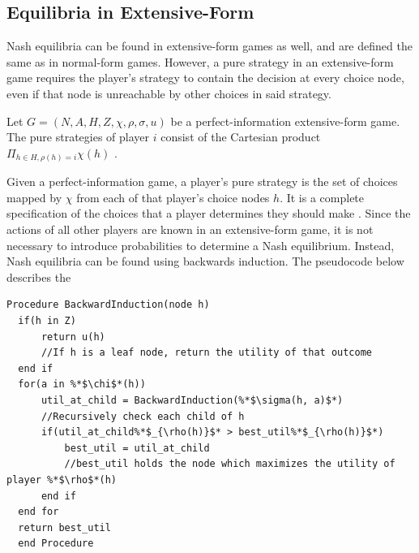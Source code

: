 \subsection{Equilibria in Extensive-Form}
Nash equilibria can be found in extensive-form games as well, and are defined the same as in normal-form games. However, a pure strategy in an extensive-form game requires the player's strategy to contain the decision at every choice node, even if that node is unreachable by other choices in said strategy.\\
\begin{define}
  Let $G = (N, A, H, Z, \chi, \rho, \sigma, u)$ be a perfect-information extensive-form game. The pure strategies of player $i$ consist of the Cartesian product $\Pi_{h\in H, \rho(h)=i}\chi(h)$ \cite{shoh09}.
\end{define}
Given a perfect-information game, a player's pure strategy is the set of choices mapped by $\chi$ from each of that player's choice nodes $h$. It is a complete specification of the choices that a player determines they should make \cite{shoh09}. Since the actions of all other players are known in an extensive-form game, it is not necessary to introduce probabilities to determine a Nash equilibrium. Instead, Nash equilibria can be found using backwards induction. The pseudocode below describes the 

\begin{lstlisting}[language=pseudocode]
  Procedure BackwardInduction(node h)
  if(h in Z)
      return u(h)
      //If h is a leaf node, return the utility of that outcome
  end if
  for(a in %*$\chi$*(h))
      util_at_child = BackwardInduction(%*$\sigma(h, a)$*)
      //Recursively check each child of h
      if(util_at_child%*$_{\rho(h)}$* > best_util%*$_{\rho(h)}$*)
          best_util = util_at_child
          //best_util holds the node which maximizes the utility of player %*$\rho$*(h)
      end if
  end for
  return best_util
  end Procedure
\end{lstlisting}

